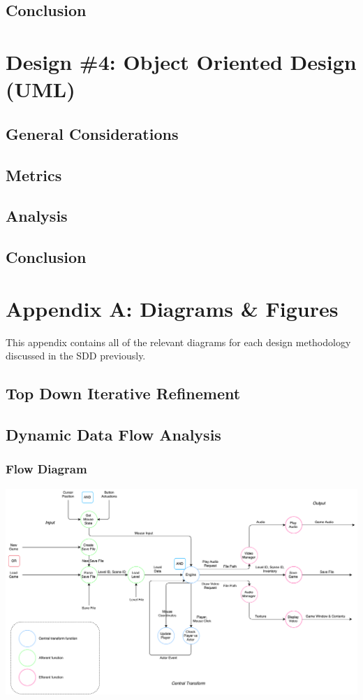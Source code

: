 \documentclass{article}
\begin{document}
	\subsection{Conclusion}
%
%
\section{Design \#4: Object Oriented Design (UML)}
	\subsection{General Considerations}
	\subsection{Metrics}
	\subsection{Analysis}
	\subsection{Conclusion}
%
%
\section{Appendix A: Diagrams \& Figures}
	This appendix contains all of the relevant diagrams for each design methodology discussed in the SDD previously.
	\subsection{Top Down Iterative Refinement}
	\subsection{Dynamic Data Flow Analysis}
		\subsubsection{Flow Diagram}
			\begin{center}
				\includegraphics[scale=0.35]{ddfFlow}
			\end{center}
\end{document}
